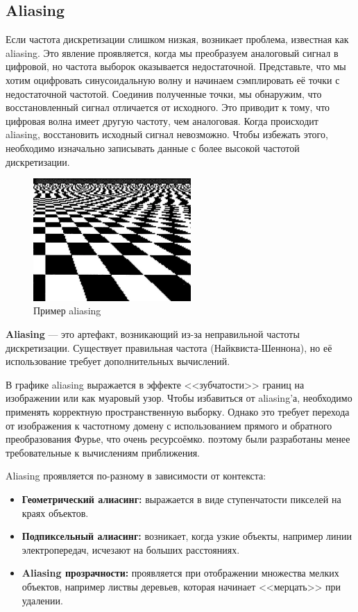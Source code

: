 
\subsection{Aliasing}
Если частота дискретизации слишком низкая, возникает проблема, известная как aliasing. Это явление проявляется, когда мы преобразуем аналоговый сигнал в цифровой, но частота выборок оказывается недостаточной. Представьте, что мы хотим оцифровать синусоидальную волну и начинаем сэмплировать её точки с недостаточной частотой. Соединив полученные точки, мы обнаружим, что восстановленный сигнал отличается от исходного. Это приводит к тому, что цифровая волна имеет другую частоту, чем аналоговая. Когда происходит aliasing, восстановить исходный сигнал невозможно. Чтобы избежать этого, необходимо изначально записывать данные с более высокой частотой дискретизации.

\begin{figure}[H]
    \centering
    \includegraphics[width = 6cm]{1.png}
    \caption{Пример aliasing}
    \label{fig:float}
\end{figure}

\textbf{Aliasing }— это артефакт, возникающий из-за неправильной частоты дискретизации. Существует правильная частота (Найквиста-Шеннона), но её использование требует дополнительных вычислений.

В графике aliasing выражается в эффекте <<зубчатости>> границ на изображении или как муаровый узор. Чтобы избавиться от aliasing'а, необходимо применять корректную пространственную выборку. Однако это требует перехода от изображения к частотному домену с использованием прямого и обратного преобразования Фурье, что очень ресурсоёмко. поэтому были разработаны менее требовательные к вычислениям приближения.

Aliasing проявляется по-разному в зависимости от контекста:

\begin{itemize}
    \item \textbf{Геометрический алиасинг:} выражается в виде ступенчатости пикселей на краях объектов.
    \item \textbf{Подпиксельный алиасинг:} возникает, когда узкие объекты, например линии электропередач, исчезают на больших расстояниях.
    \item \textbf{Aliasing прозрачности:} проявляется при отображении множества мелких объектов, например листвы деревьев, которая начинает <<мерцать>> при удалении.
\end{itemize}

